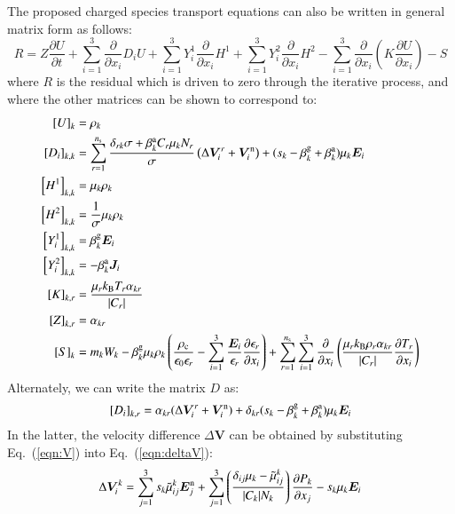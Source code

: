 \documentclass{warpdoc}
\newcommand{\alb}{\vspace{0.1cm}\\} %
\newcommand{\ns}{{n_{\rm s}}}
\newcommand{\nd}{3}
\renewcommand{\vec}[1]{\bm{#1}}
\begin{document}
The proposed charged species transport equations can also be written in general matrix form as follows:
%
\begin{equation}
  R=Z\frac{\partial U}{\partial t} + \sum_{i=1}^3\frac{\partial}{\partial x_i} D_i U
    + \sum_{i=1}^3 Y_i^1 \frac{\partial}{\partial x_i} H^1 
    + \sum_{i=1}^3 Y_i^2 \frac{\partial}{\partial x_i} H^2 
    - \sum_{i=1}^3  \frac{\partial}{\partial x_i} \left( K \frac{\partial U}{\partial x_i} \right)-S
\label{eqn:Rproposed}
\end{equation}
%
where $R$ is the residual which is driven to zero through the iterative process, and where the other matrices can be shown to correspond to:
%
\begin{align}
 \left[U\right]_k&=\rho_k \alb
  \left[D_i\right]_{k,k}&=\sum_{r=1}^\ns \frac{\delta_{rk}\sigma+\beta_k^{\rm a} C_r  \mu_k N_r}{\sigma} \left(\Delta \vec{V}_i^r +\vec{V}^{\rm n}_i\right)  +(s_k-\beta_k^{\rm g}+ \beta^{\rm a}_k) \mu_k  \vec{E}_i \alb
 \left[H^1\right]_{k,k}&= \mu_k \rho_k  \alb
 \left[H^2\right]_{k,k}&= \frac{1}{\sigma} \mu_k \rho_k \alb
 \left[Y_i^1\right]_{k,k}&=\beta_k^{\rm g} \vec{E}_i  \alb
 \left[Y_i^2\right]_{k,k}&=- \beta_k^{\rm a} \vec{J}_i \alb
 \left[K\right]_{k,r} &= \frac{\mu_r k_{\rm B} T_r \alpha_{kr}}{|C_r|} \alb
 \left[Z\right]_{k,r} &= \alpha_{kr} \alb
 \left[S\right]_k &= m_k W_k 
-\beta_k^{\rm g} \mu_{k} \rho_{k}\left(
  \frac{\rho_{\rm c}}{\epsilon_0\epsilon_r}
  -\sum_{i=1}^3 \frac{\vec{E}_i}{\epsilon_r} \frac{\partial \epsilon_r}{\partial x_i}  
\right)
+ \sum_{r=1}^\ns \sum_{i=1}^3  \frac{\partial}{\partial x_i} \left( \frac{\mu_r k_{\rm B} \rho_r \alpha_{kr}}{|C_r|}  \frac{\partial T_r}{\partial x_i} \right)
\end{align}
%
Alternately, we can write the matrix $D$ as:
%
\begin{equation}
 \left[D_i\right]_{k,r}=\alpha_{kr}(\Delta \vec{V}_i^r +\vec{V}_i^{\rm n})+\delta_{kr}(s_k-\beta_k^{\rm g}+ \beta^{\rm a}_k) \mu_k  \vec{E}_i 
\end{equation}
%
In the latter, the velocity difference $\Delta \vec{V}$ can be obtained by substituting Eq.\ (\ref{eqn:V}) into Eq.\ (\ref{eqn:deltaV}):
%
\begin{equation}
 \Delta \vec{V}_i^k = 
   \sum_{j=1}^\nd s_k \wtilde{\mu}^k_{ij}  \vec{E}_j^{\rm n}
      + \sum_{j=1}^\nd  \left(\frac{\delta_{ij} \mu_k-\wtilde{\mu}^{k}_{ij}}{|C_k| N_k}\right) \frac{\partial P_k}{\partial x_j}
-  s_k \mu_k  \vec{E}_i
\end{equation}
\end{document}
